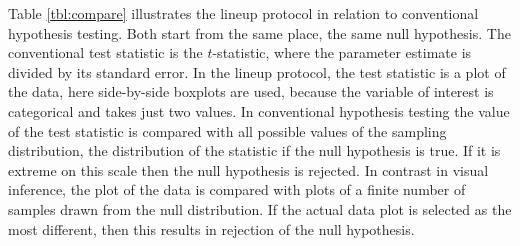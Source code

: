 \documentclass{article}
\begin{document}
Table \ref{tbl:compare} illustrates the lineup protocol in relation to conventional hypothesis testing. Both start from the same place, the same null hypothesis. The conventional test statistic is the $t$-statistic, where the parameter estimate is divided by its standard error. In the lineup protocol, the test statistic is a plot of the data, here side-by-side boxplots are used, because the variable of interest is categorical and takes just two values. In conventional hypothesis testing the value of the test statistic is compared with all possible values of the sampling distribution, the distribution of the statistic if the null hypothesis is true. If it is extreme on this scale then the null hypothesis is rejected. In contrast in visual inference, the plot of the data is compared with plots of a finite number of samples drawn from the null distribution. If the actual data plot is selected as the most different, then this results in rejection of the null hypothesis.
\end{document}
